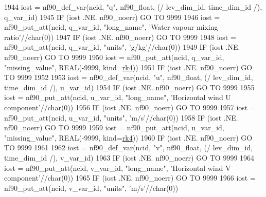 \begin{DoxyCode}
1944     iost    = nf90\_def\_var(ncid, \textcolor{stringliteral}{"q"}, nf90\_float, (/ lev\_dim\_id, time\_dim\_id /), q\_var\_id)
1945     \textcolor{keywordflow}{IF} (iost .NE. nf90\_noerr) \textcolor{keywordflow}{GO TO} 9999
1946     iost    = nf90\_put\_att(ncid, q\_var\_id, \textcolor{stringliteral}{"long\_name"}, \textcolor{stringliteral}{'Water vapour mixing ratio'}//char(0))
1947     \textcolor{keywordflow}{IF} (iost .NE. nf90\_noerr) \textcolor{keywordflow}{GO TO} 9999
1948     iost    = nf90\_put\_att(ncid, q\_var\_id, \textcolor{stringliteral}{"units"}, \textcolor{stringliteral}{'g/kg'}//char(0))
1949     \textcolor{keywordflow}{IF} (iost .NE. nf90\_noerr) \textcolor{keywordflow}{GO TO} 9999
1950     iost    = nf90\_put\_att(ncid, q\_var\_id, \textcolor{stringliteral}{"missing\_value"}, \textcolor{keywordtype}{REAL}(-9999, kind=\hyperlink{namespaceportable_abaed22a509442771d3fba69bebda0b33}{rk4}))
1951     \textcolor{keywordflow}{IF} (iost .NE. nf90\_noerr) \textcolor{keywordflow}{GO TO} 9999
1952 
1953     iost    = nf90\_def\_var(ncid, \textcolor{stringliteral}{"u"}, nf90\_float, (/ lev\_dim\_id, time\_dim\_id /), u\_var\_id)
1954     \textcolor{keywordflow}{IF} (iost .NE. nf90\_noerr) \textcolor{keywordflow}{GO TO} 9999
1955     iost    = nf90\_put\_att(ncid, u\_var\_id, \textcolor{stringliteral}{"long\_name"}, \textcolor{stringliteral}{'Horizontal wind U component'}//char(0))
1956     \textcolor{keywordflow}{IF} (iost .NE. nf90\_noerr) \textcolor{keywordflow}{GO TO} 9999
1957     iost    = nf90\_put\_att(ncid, u\_var\_id, \textcolor{stringliteral}{"units"}, \textcolor{stringliteral}{'m/s'}//char(0))
1958     \textcolor{keywordflow}{IF} (iost .NE. nf90\_noerr) \textcolor{keywordflow}{GO TO} 9999
1959     iost    = nf90\_put\_att(ncid, u\_var\_id, \textcolor{stringliteral}{"missing\_value"}, \textcolor{keywordtype}{REAL}(-9999, kind=\hyperlink{namespaceportable_abaed22a509442771d3fba69bebda0b33}{rk4}))
1960     \textcolor{keywordflow}{IF} (iost .NE. nf90\_noerr) \textcolor{keywordflow}{GO TO} 9999
1961 
1962     iost    = nf90\_def\_var(ncid, \textcolor{stringliteral}{"v"}, nf90\_float, (/ lev\_dim\_id, time\_dim\_id /), v\_var\_id)
1963     \textcolor{keywordflow}{IF} (iost .NE. nf90\_noerr) \textcolor{keywordflow}{GO TO} 9999
1964     iost    = nf90\_put\_att(ncid, v\_var\_id, \textcolor{stringliteral}{"long\_name"}, \textcolor{stringliteral}{'Horizontal wind V component'}//char(0))
1965     \textcolor{keywordflow}{IF} (iost .NE. nf90\_noerr) \textcolor{keywordflow}{GO TO} 9999
1966     iost    = nf90\_put\_att(ncid, v\_var\_id, \textcolor{stringliteral}{"units"}, \textcolor{stringliteral}{'m/s'}//char(0))

\end{DoxyCode}
